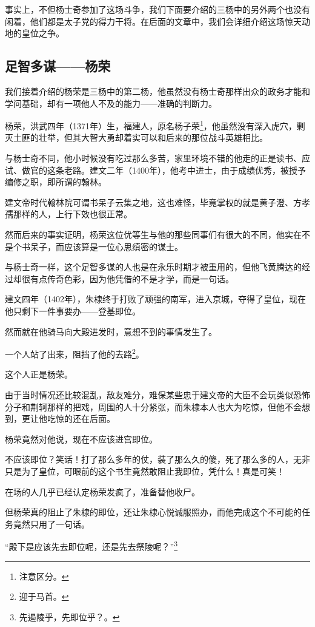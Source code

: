 \begin{multicols}{\theparacolNo}
事实上，不但杨士奇参加了这场斗争，我们下面要介绍的三杨中的另外两个也没有闲着，他们都是太子党的得力干将。在后面的文章中，我们会详细介绍这场惊天动地的皇位之争。

\subsection{足智多谋——杨荣}
我们接着介绍的杨荣是三杨中的第二杨，他虽然没有杨士奇那样出众的政务才能和学问基础，却有一项他人不及的能力——准确的判断力。

杨荣，洪武四年（1371年）生，福建人，原名杨子荣\footnote{注意区分。}，他虽然没有深入虎穴，剿灭土匪的壮举，但其大智大勇却着实可以和后来的那位战斗英雄相比。

与杨士奇不同，他小时候没有吃过那么多苦，家里环境不错的他走的正是读书、应试、做官的这条老路。建文二年（1400年），他考中进士，由于成绩优秀，被授予编修之职，即所谓的翰林。

建文帝时代翰林院可谓书呆子云集之地，这也难怪，毕竟掌权的就是黄子澄、方孝孺那样的人，上行下效也很正常。

然而后来的事实证明，杨荣这位优等生与他的那些同事们有很大的不同，他实在不是个书呆子，而应该算是一位心思缜密的谋士。

与杨士奇一样，这个足智多谋的人也是在永乐时期才被重用的，但他飞黄腾达的经过却很有点传奇色彩，因为他凭借的不是才学，而是一句话。

建文四年（1402年），朱棣终于打败了顽强的南军，进入京城，夺得了皇位，现在他只剩下一件事要办——登基即位。

然而就在他骑马向大殿进发时，意想不到的事情发生了。

一个人站了出来，阻挡了他的去路\footnote{迎于马首。}。

这个人正是杨荣。

由于当时情况还比较混乱，敌友难分，难保某些忠于建文帝的大臣不会玩类似恐怖分子和荆轲那样的把戏，周围的人十分紧张，而朱棣本人也大为吃惊，但他不会想到，更让他吃惊的还在后面。

杨荣竟然对他说，现在不应该进宫即位。

不应该即位？笑话！打了那么多年的仗，装了那么久的傻，死了那么多的人，无非只是为了皇位，可眼前的这个书生竟然敢阻止我即位，凭什么！真是可笑！

在场的人几乎已经认定杨荣发疯了，准备替他收尸。

但杨荣真的阻止了朱棣的即位，还让朱棣心悦诚服照办，而他完成这个不可能的任务竟然只用了一句话。

“殿下是应该先去即位呢，还是先去祭陵呢？”\footnote{先遏陵乎，先即位乎？。}


\end{multicols}
